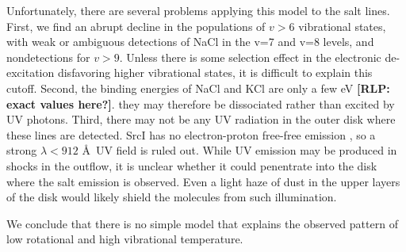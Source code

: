 \documentclass[twocolumn]{aastex62}
\newcommand{\sourcei}{SrcI\xspace}
\newcommand{\rlp}[1]{\textcolor{blue!65!black}{\textbf{[RLP: #1]}}}
\begin{document}

Unfortunately, there are several problems applying this model to the salt lines.
First, we find an abrupt decline in the populations of $v > 6$ vibrational states,
with weak or ambiguous detections of NaCl in the v=7 and v=8 levels, and
nondetections for $v > 9$.  Unless there is
some selection effect in the electronic de-excitation disfavoring higher vibrational
states, it is difficult to explain this cutoff.  
Second, the binding energies of NaCl and KCl are only a few eV  \rlp{exact values here?}. 
they may therefore be dissociated rather than excited by UV photons.
Third, there may not be any UV radiation in the outer disk where these lines
are detected.  \sourcei has no electron-proton free-free emission
\citep{Plambeck2013a}, so a strong $\lambda<912$ \AA\ UV field is ruled out.  While UV
emission may be produced in shocks in the outflow, it is unclear whether
it could penentrate into the disk where
the salt emission is observed.  Even a light haze of dust in the upper layers of
the disk would likely shield the molecules from such illumination.

We conclude that there is no simple model that explains the observed pattern of
low rotational and high vibrational temperature.


\end{document}
